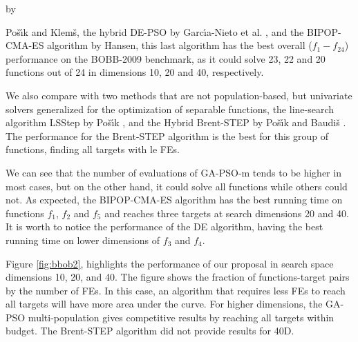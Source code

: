\documentclass[runningheads]{llncs}
\begin{document}
by {Po{\v{s}}{\'\i}k and Klem{\v{s}}, 
the hybrid DE-PSO by Garc{\'\i}a-Nieto et al. \cite{garcia2009noiseless}, 
and the BIPOP-CMA-ES algorithm \cite{hansen2009benchmarking} by Hansen, this last algorithm has the
best overall ($f_1-f_24$) performance on the BOBB-2009 benchmark,
as it  could solve 23, 22 and 20 functions out of 24 in dimensions 10, 20 and
40, respectively. 

We also compare with two methods that are not population-based, but univariate
solvers generalized for the optimization of separable functions, the
line-search algorithm LSStep by Po{\v{s}}{\'\i}k \cite{povsik2009bbob}, and the Hybrid Brent-STEP by
Po{\v{s}}{\'\i}k and Baudi{\v{s}} \cite{povsik2015dimension}. The performance for the Brent-STEP algorithm
is the best for this group of functions, finding all targets with le FEs.
 
We can see that the number of evaluations of {\sf GA-PSO-m} tends to be higher
in most cases, but on the other hand, it could solve all functions 
while others could not. As expected, the BIPOP-CMA-ES algorithm has the best running time on functions
$f_1$, $f_2$ and $f_5$ and reaches three targets at search dimensions 20 and 40.
It is worth to notice the performance of the DE algorithm, having the best
running time on lower dimensions of  $f_3$ and $f_4$.

Figure \ref{fig:bbob2}, highlights the performance of our proposal in search
space dimensions 10, 20, and 40. The figure shows the fraction of
functions-target pairs by the number of FEs. In this case, an algorithm that
requires less FEs to reach all targets will have more area under the curve. For
higher dimensions, the GA-PSO multi-population gives competitive results by
reaching all targets within budget. The Brent-STEP algorithm did not provide
results for 40D.

}
\end{document}
